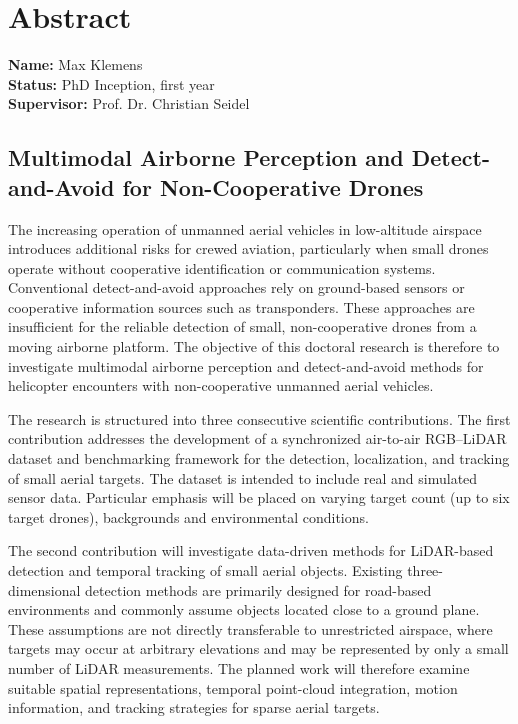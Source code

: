 \chapter{Abstract}

\noindent
\textbf{Name:} Max Klemens\\
\textbf{Status:} PhD Inception, first year\\
\textbf{Supervisor:} Prof. Dr. Christian Seidel\\

\vspace{0.5cm}

\section*{Multimodal Airborne Perception and Detect-and-Avoid for Non-Cooperative Drones}

The increasing operation of unmanned aerial vehicles in low-altitude airspace introduces additional risks for crewed aviation, particularly when small drones operate without cooperative identification or communication systems. Conventional detect-and-avoid approaches rely on ground-based sensors or cooperative information sources such as transponders. These approaches are insufficient for the reliable detection of small, non-cooperative drones from a moving airborne platform. The objective of this doctoral research is therefore to investigate multimodal airborne perception and detect-and-avoid methods for helicopter encounters with non-cooperative unmanned aerial vehicles.

The research is structured into three consecutive scientific contributions. The first contribution addresses the development of a synchronized air-to-air RGB--LiDAR dataset and benchmarking framework for the detection, localization, and tracking of small aerial targets. The dataset is intended to include real and simulated sensor data. Particular emphasis will be placed on varying target count (up to six target drones), backgrounds and environmental conditions.

The second contribution will investigate data-driven methods for LiDAR-based detection and temporal tracking of small aerial objects. Existing three-dimensional detection methods are primarily designed for road-based environments and commonly assume objects located close to a ground plane. These assumptions are not directly transferable to unrestricted airspace, where targets may occur at arbitrary elevations and may be represented by only a small number of LiDAR measurements. The planned work will therefore examine suitable spatial representations, temporal point-cloud integration, motion information, and tracking strategies for sparse aerial targets.

